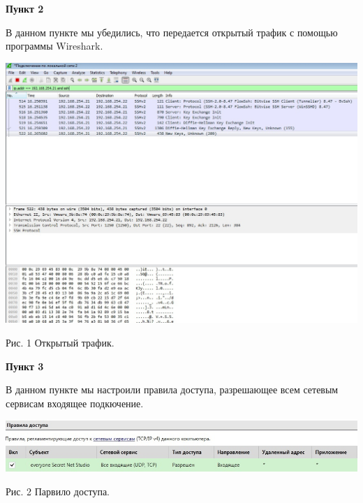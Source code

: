 \documentclass[a4paper,14pt]{extarticle}
\begin{document}
    \textbf{Пункт 2}
    \vspace{-3ex}
    \begin{center}
        \singlespacing
        В данном пункте мы убедились, что передается открытый трафик с помощью программы Wireshark.

        \includegraphics[scale=0.3]{pics/2.jpg}

       Рис. 1 Открытый трафик. 
    \end{center}

    \textbf{Пункт 3}
    \vspace{-3ex}
    \begin{center}
        \singlespacing
        В данном пункте мы настроили правила доступа, разрешающее всем сетевым сервисам входящее подкючение. 

        \includegraphics[scale=0.5]{pics/3.jpg}

        Рис. 2 Парвило доступа.
    \end{center}
\end{document}
